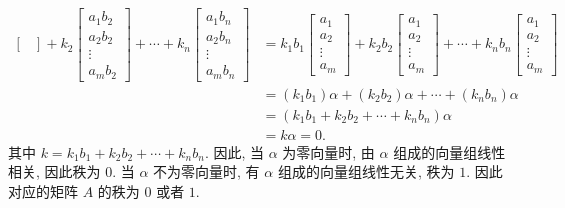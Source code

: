 \begin{enumerate}
\begin{align*}
\begin{bmatrix}
            \end{bmatrix}
            +
            k_2
            \begin{bmatrix}
                a_1b_2 \\
                a_2b_2 \\
                \vdots \\
                a_mb_2 
            \end{bmatrix}
            +
            \cdots
            +
            k_n
            \begin{bmatrix}
                a_1b_n \\
                a_2b_n \\
                \vdots \\
                a_mb_n 
            \end{bmatrix}
            &=
            k_1b_1
            \begin{bmatrix}
                a_1 \\
                a_2 \\
                \vdots \\
                a_m 
            \end{bmatrix}
            +
            k_2b_2
            \begin{bmatrix}
                a_1 \\
                a_2 \\
                \vdots \\
                a_m 
            \end{bmatrix}
            +
            \cdots
            +
            k_nb_n
            \begin{bmatrix}
                a_1 \\
                a_2 \\
                \vdots \\
                a_m 
            \end{bmatrix}
            \\
            &= (k_1b_1)\alpha + (k_2b_2)\alpha + \cdots + (k_nb_n)\alpha \\
            &= (k_1b_1 + k_2b_2 + \cdots + k_nb_n)\alpha \\
            &= k\alpha = 0.
        \end{align*}
        其中 $k = k_1b_1 + k_2b_2 + \cdots + k_nb_n$. 因此, 当 $\alpha$ 为零向量时, 由 $\alpha$ 组成的向量组线性相关, 因此秩为 $0$.
        当 $\alpha$ 不为零向量时, 有 $\alpha$ 组成的向量组线性无关, 秩为 $1$. 因此对应的矩阵 $A$ 的秩为 $0$ 或者 $1$.
\end{enumerate}
% 
